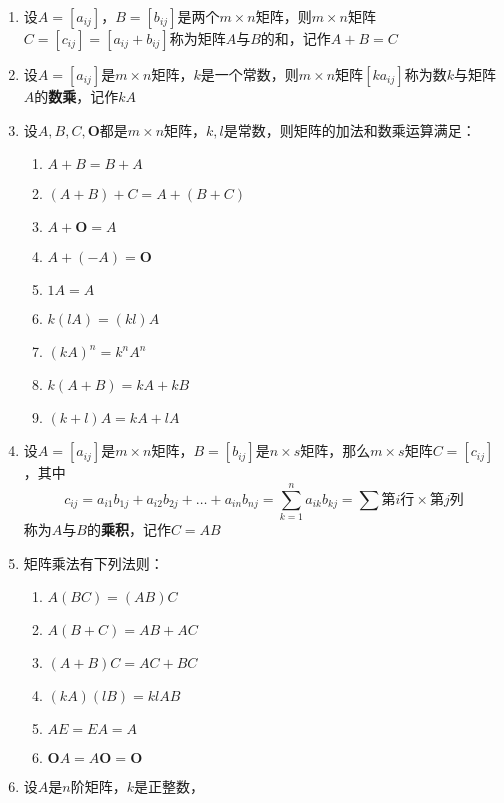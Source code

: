 \documentclass[a4paper,12pt]{article}
\begin{document}
    \begin{enumerate}
        \item 设$A = [a_{ij}]$，$B = [b_{ij}]$是两个$m \times n$矩阵，则$m \times n$矩阵$C = [c_{ij}] = [a_{ij} + b_{ij}]$称为矩阵$A$与$B$的和，记作$A + B = C$
        \item 设$A = [a_{ij}]$是$m \times n$矩阵，$k$是一个常数，则$m \times n$矩阵$[ka_{ij}]$称为数$k$与矩阵$A$的\textbf{数乘}，记作$kA$
        \item 设$A, B, C, \mathbf{O}$都是$m \times n$矩阵，$k, l$是常数，则矩阵的加法和数乘运算满足：
        \begin{enumerate}
            \item $A + B = B + A$
            \item $(A + B) + C = A + (B + C)$
            \item $A + \mathbf{O} = A$
            \item $A + (-A) = \mathbf{O}$
            \item $1A = A$
            \item $k(lA) = (kl)A$
            \item $(kA)^n = k^{n}A^n$
            \item $k(A + B) = kA + kB$
            \item $(k + l)A = kA + lA$
        \end{enumerate}
        \item 设$A = [a_{ij}]$是$m \times n$矩阵，$B = [b_{ij}]$是$n \times s$矩阵，那么$m \times s$矩阵$C = [c_{ij}]$，其中
        \[
            c_{ij} = a_{i1}b_{1j} + a_{i2}b_{2j} + \dots + a_{in}b_{nj} = \sum_{k=1}^{n} a_{ik}b_{kj} = \sum \text{第$i$行} \times \text{第$j$列}
        \]
        称为$A$与$B$的\textbf{乘积}，记作$C = AB$
        \item 矩阵乘法有下列法则：
        \begin{enumerate}
            \item $A(BC) = (AB)C$
            \item $A(B + C) = AB + AC$
            \item $(A + B)C = AC + BC$
            \item $(kA)(lB) = klAB$
            \item $AE = EA = A$
            \item $\mathbf{O}A = A\mathbf{O} = \mathbf{O}$
        \end{enumerate}
        \item 设$A$是$n$阶矩阵，$k$是正整数，
        \begin{enumerate}

\end{enumerate}
\end{enumerate}
\end{document}
